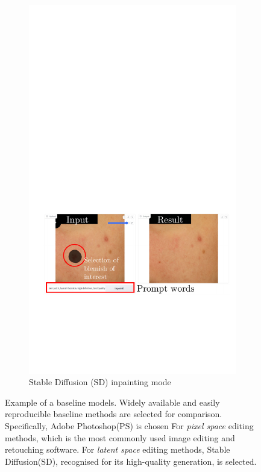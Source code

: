 \begin{spacing}{1.5}
\begin{figure}[t!]
\begin{subfigure}{.97\textwidth}
        \includegraphics[width=0.97\columnwidth]{Chapter4/sd_ui.pdf}
        \caption{Stable Diffusion (SD) inpainting mode}
    \end{subfigure}
    \caption{Example of a baseline models. Widely available and easily reproducible baseline methods are selected for comparison. Specifically, Adobe Photoshop(PS) is chosen For \textit{pixel space} editing methods, which is the most commonly used image editing and retouching software. For \textit{latent space} editing methods, Stable Diffusion(SD), recognised for its high-quality generation, is selected.}
    \label{fig:ps_sd}
\end{figure}


\end{spacing}
